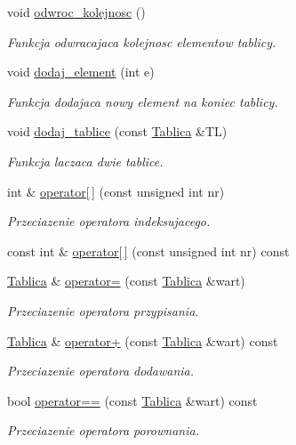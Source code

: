 \begin{DoxyCompactItemize}
void \hyperlink{class_tablica_a707a094005af8ac9682b245eeb582093}{odwroc\-\_\-kolejnosc} ()
\begin{DoxyCompactList}\small\item\em Funkcja odwracajaca kolejnosc elementow tablicy. \end{DoxyCompactList}\item 
void \hyperlink{class_tablica_a5e7aa8faccfeea60901e610c6d63be22}{dodaj\-\_\-element} (int e)
\begin{DoxyCompactList}\small\item\em Funkcja dodajaca nowy element na koniec tablicy. \end{DoxyCompactList}\item 
void \hyperlink{class_tablica_acf4d58b8d20dc799f64a001fd5b18caf}{dodaj\-\_\-tablice} (const \hyperlink{class_tablica}{Tablica} \&T\-L)
\begin{DoxyCompactList}\small\item\em Funkcja laczaca dwie tablice. \end{DoxyCompactList}\item 
int \& \hyperlink{class_tablica_ab915062c590fdb7f1ac70dd11133ecdb}{operator\mbox{[}$\,$\mbox{]}} (const unsigned int nr)
\begin{DoxyCompactList}\small\item\em Przeciazenie operatora indeksujacego. \end{DoxyCompactList}\item 
const int \& \hyperlink{class_tablica_a0fa3ff551c83b2543746f939729dce6b}{operator\mbox{[}$\,$\mbox{]}} (const unsigned int nr) const 
\item 
\hyperlink{class_tablica}{Tablica} \& \hyperlink{class_tablica_a050a840ab814f6e93ac7be45d487c43e}{operator=} (const \hyperlink{class_tablica}{Tablica} \&wart)
\begin{DoxyCompactList}\small\item\em Przeciazenie operatora przypisania. \end{DoxyCompactList}\item 
\hyperlink{class_tablica}{Tablica} \& \hyperlink{class_tablica_a5de8d8a9d13c7bcdcec631f35def2b13}{operator+} (const \hyperlink{class_tablica}{Tablica} \&wart) const 
\begin{DoxyCompactList}\small\item\em Przeciazenie operatora dodawania. \end{DoxyCompactList}\item 
bool \hyperlink{class_tablica_a3f16487f9b2673af1488d124f416dc33}{operator==} (const \hyperlink{class_tablica}{Tablica} \&wart) const 
\begin{DoxyCompactList}\small\item\em Przeciazenie operatora porownania. \end{DoxyCompactList}\end{DoxyCompactItemize}
